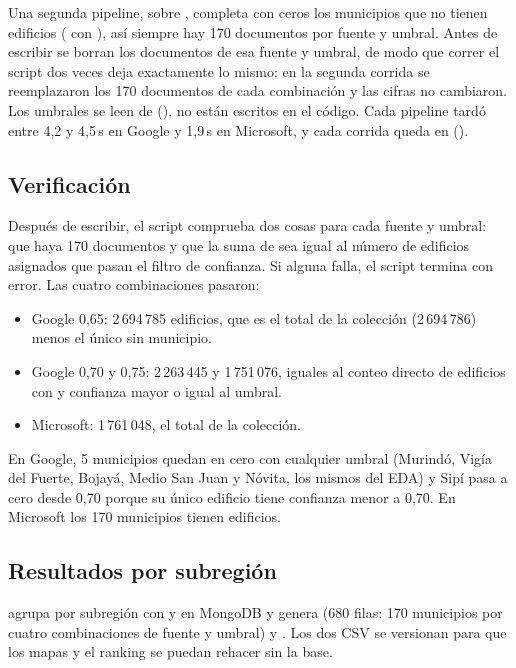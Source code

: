 Una segunda pipeline, sobre , completa con ceros los
municipios que no tienen edificios ( con
), así siempre hay 170 documentos por
fuente y umbral. Antes de escribir se borran los documentos de esa fuente y
umbral, de modo que correr el script dos veces deja exactamente lo mismo: en
la segunda corrida se reemplazaron los 170 documentos de cada combinación y
las cifras no cambiaron. Los umbrales se leen de 
(), no están escritos en
el código. Cada pipeline tardó entre 4,2 y 4,5\,s en Google y 1,9\,s en
Microsoft, y cada corrida queda en 
().

\subsection{Verificación}

Después de escribir, el script comprueba dos cosas para cada fuente y umbral:
que haya 170 documentos y que la suma de  sea igual al
número de edificios asignados que pasan el filtro de confianza. Si alguna
falla, el script termina con error. Las cuatro combinaciones pasaron:

\begin{itemize}
  \item Google 0,65: 2\,694\,785 edificios, que es el total de la colección
        (2\,694\,786) menos el único sin municipio.
  \item Google 0,70 y 0,75: 2\,263\,445 y 1\,751\,076, iguales al conteo
        directo de edificios con  y confianza mayor o igual
        al umbral.
  \item Microsoft: 1\,761\,048, el total de la colección.
\end{itemize}

En Google, 5 municipios quedan en cero con cualquier umbral (Murindó, Vigía
del Fuerte, Bojayá, Medio San Juan y Nóvita, los mismos del EDA) y Sipí pasa
a cero desde 0,70 porque su único edificio tiene confianza menor a 0,70. En
Microsoft los 170 municipios tienen edificios.

\subsection{Resultados por subregión}

 agrupa  por subregión con
 y  en MongoDB y genera
 (680 filas: 170 municipios por
cuatro combinaciones de fuente y umbral) y
. Los dos CSV se versionan para
que los mapas y el ranking se puedan rehacer sin la base.

